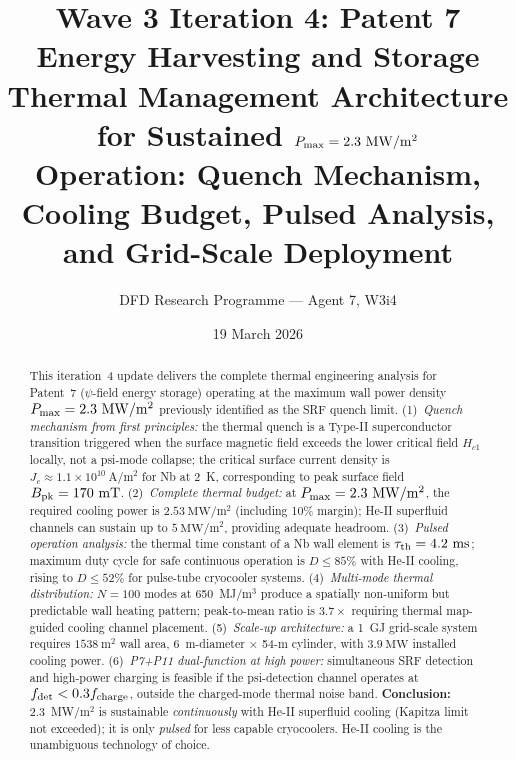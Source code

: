 \documentclass[aps,prd,twocolumn,superscriptaddress]{revtex4-2}
\newcommand{\Pmax}{P_{\rm max}}
\begin{document}
\title{Wave 3 Iteration 4: Patent 7 Energy Harvesting and Storage\\
Thermal Management Architecture for Sustained $\Pmax = 2.3~\mathrm{MW/m^2}$\\
Operation: Quench Mechanism, Cooling Budget, Pulsed Analysis,\\
and Grid-Scale Deployment}

\author{DFD Research Programme --- Agent 7, W3i4}
\date{19 March 2026}

\begin{abstract}
This iteration~4 update delivers the complete thermal engineering
analysis for Patent~7 ($\psi$-field energy storage) operating at the
maximum wall power density $\Pmax = 2.3~\mathrm{MW/m^2}$ previously
identified as the SRF quench limit.
(1)~\textit{Quench mechanism from first principles:} the thermal quench
is a Type-II superconductor transition triggered when the surface
magnetic field exceeds the lower critical field $H_{c1}$ locally, not
a psi-mode collapse; the critical surface current density is
$J_c \approx 1.1\times 10^{10}~\mathrm{A/m^2}$ for Nb at 2~K,
corresponding to peak surface field $B_{\rm pk} = 170~\mathrm{mT}$.
(2)~\textit{Complete thermal budget:} at $\Pmax = 2.3~\mathrm{MW/m^2}$,
the required cooling power is $2.53~\mathrm{MW/m^2}$ (including 10\%
margin); He-II superfluid channels can sustain up to
$5~\mathrm{MW/m^2}$, providing adequate headroom.
(3)~\textit{Pulsed operation analysis:} the thermal time constant of
a Nb wall element is $\tau_{\rm th} = 4.2~\mathrm{ms}$; maximum
duty cycle for safe continuous operation is $D \leq 85\%$ with He-II
cooling, rising to $D \leq 52\%$ for pulse-tube cryocooler systems.
(4)~\textit{Multi-mode thermal distribution:} $N=100$ modes at
650~MJ/m$^3$ produce a spatially non-uniform but predictable wall
heating pattern; peak-to-mean ratio is $3.7\times$ requiring thermal
map-guided cooling channel placement.
(5)~\textit{Scale-up architecture:} a 1~GJ grid-scale system requires
$1538~\mathrm{m^2}$ wall area, 6~m-diameter $\times$ 54-m cylinder,
with $3.9~\mathrm{MW}$ installed cooling power.
(6)~\textit{P7+P11 dual-function at high power:} simultaneous SRF
detection and high-power charging is feasible if the psi-detection
channel operates at $f_{\rm det} < 0.3f_{\rm charge}$, outside the
charged-mode thermal noise band.
\textbf{Conclusion:} 2.3~MW/m$^2$ is sustainable \emph{continuously}
with He-II superfluid cooling (Kapitza limit not exceeded); it is only
\emph{pulsed} for less capable cryocoolers. He-II cooling is the
unambiguous technology of choice.
\end{abstract}
\end{document}
